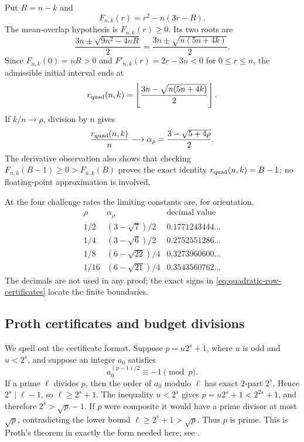 \documentclass[11pt,a4paper]{amsart}
\numberwithin{equation}{section}
\theoremstyle{remark}
\newcommand{\floor}[1]{\left\lfloor #1\right\rfloor}
\begin{document}
Put \(R=n-k\) and
\[
                  F_{n,k}(r)=r^2-n(3r-R).
\]
The mean-overlap hypothesis is \(F_{n,k}(r)\ge0\).  Its two roots are
\[
       \frac{3n\pm\sqrt{9n^2-4nR}}2
       =\frac{3n\pm\sqrt{n(5n+4k)}}2.
\]
Since \(F_{n,k}(0)=nR>0\) and
\(F'_{n,k}(r)=2r-3n<0\) for \(0\le r\le n\), the admissible initial
interval ends at
\[
 r_{\rm quad}(n,k)=
 \floor{\frac{3n-\sqrt{n(5n+4k)}}2}.
\]
If \(k/n\to\rho\), division by \(n\) gives
\[
 \frac{r_{\rm quad}(n,k)}n
 \longrightarrow
 \alpha_\rho=\frac{3-\sqrt{5+4\rho}}2.
\]
The derivative observation also shows that checking
\(F_{n,k}(B-1)\ge0>F_{n,k}(B)\) proves the exact identity
\(r_{\rm quad}(n,k)=B-1\); no floating-point approximation is involved.

At the four challenge rates the limiting constants are, for orientation,
\[
\begin{array}{c|c|c}
 \rho&\alpha_\rho&\text{decimal value}\\ \hline
 1/2&(3-\sqrt7)/2&0.1771243444\ldots\\
 1/4&(3-\sqrt6)/2&0.2752551286\ldots\\
 1/8&(6-\sqrt{22})/4&0.3273960600\ldots\\
 1/16&(6-\sqrt{21})/4&0.3543560762\ldots
\end{array}
\]
The decimals are not used in any proof; the exact signs in
\eqref{eq:quadratic-row-certificates} locate the finite boundaries.

\subsection{Proth certificates and budget divisions}

We spell out the certificate format.  Suppose
\(p=u2^s+1\), where \(u\) is odd and \(u<2^s\), and suppose an integer
\(a_0\) satisfies
\[
                         a_0^{(p-1)/2}\equiv-1\pmod p.
\]
If a prime \(\ell\) divides \(p\), then the order of \(a_0\) modulo
\(\ell\) has exact \(2\)-part \(2^s\).  Hence \(2^s\mid\ell-1\), so
\(\ell\ge2^s+1\).  The inequality \(u<2^s\) gives
\(p=u2^s+1<2^{2s}+1\), and therefore \(2^s>\sqrt p-1\).
If \(p\) were composite it would have a prime divisor at most
\(\sqrt p\), contradicting the lower bound \(\ell\ge2^s+1>\sqrt p\).
Thus \(p\) is prime.  This is Proth's theorem in exactly the form needed
here; see \cite[Sec.~4.1]{Riesel}.
\end{document}
